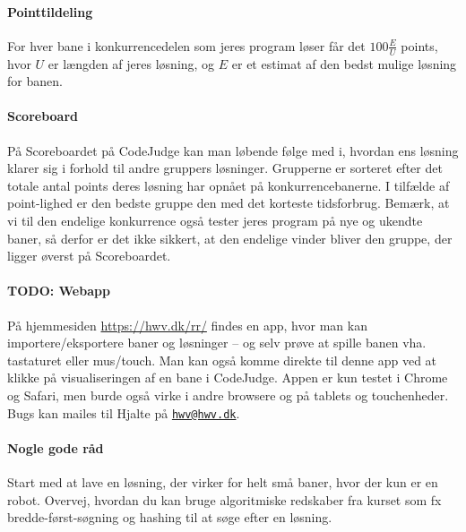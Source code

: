 \documentclass[10pt, a4paper]{article}
\begin{document}
\paragraph{Pointtildeling} For hver bane i konkurrencedelen som jeres program løser får det $100 \frac{E}{U}$ points, hvor $U$ er længden af jeres løsning, og $E$ er et estimat af den bedst mulige løsning for banen.

\paragraph{Scoreboard} På Scoreboardet på CodeJudge kan man løbende følge med i, hvordan ens løsning klarer sig i forhold til andre gruppers løsninger.
Grupperne er sorteret efter det totale antal points deres løsning har opnået på konkurrencebanerne.
I tilfælde af point-lighed er den bedste gruppe den med det korteste tidsforbrug.
Bemærk, at vi til den endelige konkurrence også tester jeres program på nye og ukendte baner, så derfor er det ikke sikkert, at den endelige vinder bliver den gruppe, der ligger øverst på Scoreboardet.

\paragraph{TODO: Webapp} På hjemmesiden \url{https://hwv.dk/rr/} findes en app, hvor man kan importere/eksportere baner og løsninger -- og selv prøve at spille banen vha. tastaturet eller mus/touch. Man kan også komme direkte til denne app ved at klikke på visualiseringen af en bane i CodeJudge. Appen er kun testet i Chrome og Safari, men burde også virke i andre browsere og på tablets og touchenheder. Bugs kan mailes til Hjalte på \href{mailto:hwv@hwv.dk}{\texttt{hwv@hwv.dk}}.

\paragraph{Nogle gode råd} Start med at lave en løsning, der virker for helt små baner, hvor der kun er en robot. Overvej, hvordan du kan bruge algoritmiske redskaber fra kurset som fx bredde-først-søgning og hashing til at søge efter en løsning.
\end{document}
